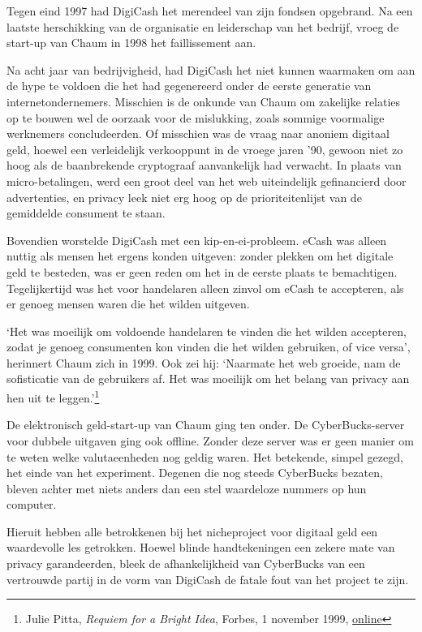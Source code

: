 \documentclass[
  a5paper,
  smalldemyvopaper,11pt,twoside,onecolumn,openright,extrafontsizes,
hidelinks]{memoir}
\begin{document}
Tegen eind 1997 had DigiCash het merendeel van zijn fondsen opgebrand.
Na een laatste herschikking van de organisatie en leiderschap van het
bedrijf, vroeg de start-up van Chaum in 1998 het faillissement aan.

Na acht jaar van bedrijvigheid, had DigiCash het niet kunnen waarmaken
om aan de hype te voldoen die het had gegenereerd onder de eerste
generatie van internetondernemers. Misschien is de onkunde van Chaum om
zakelijke relaties op te bouwen wel de oorzaak voor de mislukking, zoals
sommige voormalige werknemers concludeerden. Of misschien was de vraag
naar anoniem digitaal geld, hoewel een verleidelijk verkooppunt in de
vroege jaren '90, gewoon niet zo hoog als de baanbrekende cryptograaf
aanvankelijk had verwacht. In plaats van micro-betalingen, werd een
groot deel van het web uiteindelijk gefinancierd door advertenties, en
privacy leek niet erg hoog op de prioriteitenlijst van de gemiddelde
consument te staan.

Bovendien worstelde DigiCash met een kip-en-ei-probleem. eCash was
alleen nuttig als mensen het ergens konden uitgeven: zonder plekken om
het digitale geld te besteden, was er geen reden om het in de eerste
plaats te bemachtigen. Tegelijkertijd was het voor handelaren alleen
zinvol om eCash te accepteren, als er genoeg mensen waren die het wilden
uitgeven.

`Het was moeilijk om voldoende handelaren te vinden die het wilden
accepteren, zodat je genoeg consumenten kon vinden die het wilden
gebruiken, of vice versa', herinnert Chaum zich in 1999. Ook zei hij:
`Naarmate het web groeide, nam de sofisticatie van de gebruikers af. Het
was moeilijk om het belang van privacy aan hen uit te
leggen.'\footnote{Julie Pitta, \emph{Requiem for a Bright Idea}, Forbes,
  1 november 1999,
  \href{https://www.forbes.com/forbes/1999/1101/6411390a.html}{online}}

De elektronisch geld-start-up van Chaum ging ten onder. De
CyberBucks-server voor dubbele uitgaven ging ook offline. Zonder deze
server was er geen manier om te weten welke valutaeenheden nog geldig
waren. Het betekende, simpel gezegd, het einde van het experiment.
Degenen die nog steeds CyberBucks bezaten, bleven achter met niets
anders dan een stel waardeloze nummers op hun computer.

Hieruit hebben alle betrokkenen bij het nicheproject voor digitaal geld
een waardevolle les getrokken. Hoewel blinde handtekeningen een zekere
mate van privacy garandeerden, bleek de afhankelijkheid van CyberBucks
van een vertrouwde partij in de vorm van DigiCash de fatale fout van het
project te zijn.
\end{document}
